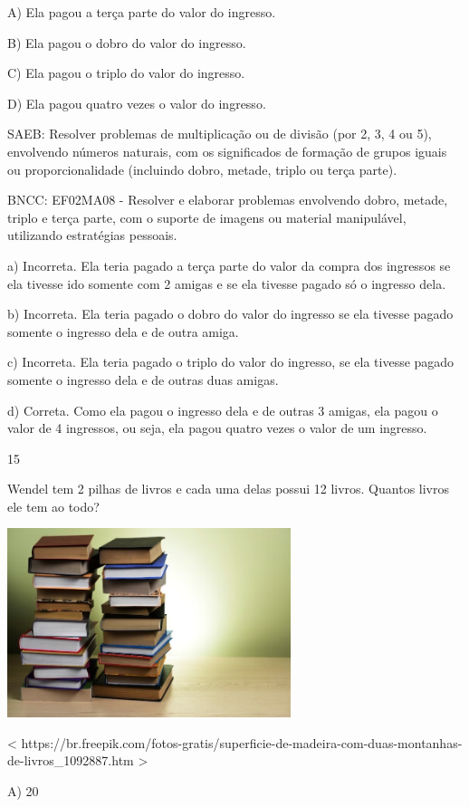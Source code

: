 \begin{escolha}
\begin{escolha}
{{{{A) Ela pagou a terça parte do valor do ingresso.

B) Ela pagou o dobro do valor do ingresso.

C) Ela pagou o triplo do valor do ingresso.

D) Ela pagou quatro vezes o valor do ingresso.

SAEB: Resolver problemas de multiplicação ou de divisão (por 2,
3, 4 ou 5), envolvendo números naturais, com os significados de formação
de grupos iguais ou proporcionalidade (incluindo dobro, metade, triplo
ou terça parte).

BNCC: EF02MA08 - Resolver e elaborar
problemas envolvendo dobro, metade, triplo e terça parte, com o suporte de imagens ou material manipulável, utilizando estratégias pessoais.

a) Incorreta. Ela teria pagado a terça parte do valor da compra dos ingressos se ela
tivesse ido somente com 2 amigas e se ela tivesse pagado só o ingresso
dela.

b) Incorreta. Ela teria pagado o dobro do valor do ingresso se ela
tivesse pagado somente o ingresso dela e de outra amiga.

c) Incorreta. Ela teria pagado o triplo do valor do ingresso, se ela
tivesse pagado somente o ingresso dela e de outras duas amigas.

d) Correta. Como ela pagou o ingresso dela e de outras 3 amigas, ela
pagou o valor de 4 ingressos, ou seja, ela pagou quatro vezes o valor de um ingresso.

\num{15}

Wendel tem 2 pilhas de livros e cada uma delas possui 12 livros. Quantos livros ele tem ao todo?

\includegraphics[width=3.26042in,height=2.17361in]{media/image124.jpeg}

\textless{}
https://br.freepik.com/fotos-gratis/superficie-de-madeira-com-duas-montanhas-de-livros\_1092887.htm
\textgreater{}

A) 20

}}}}
\end{escolha}
\end{escolha}
